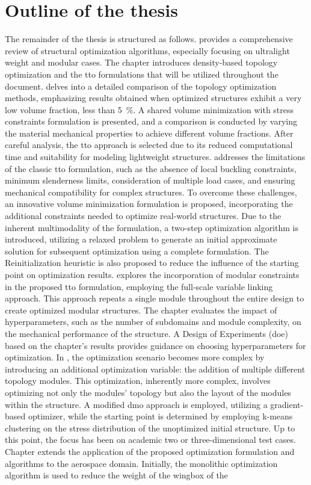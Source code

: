 \section*{Outline of the thesis}
The remainder of the thesis is structured as follows.  provides a comprehensive review of structural optimization algorithms, especially focusing on ultralight weight and modular cases. The chapter introduces density-based topology optimization and the \gls{tto} formulations that will be utilized throughout the document.  delves into a detailed comparison of the topology optimization methods, emphasizing results obtained when optimized structures exhibit a very low volume fraction, \ie less than \qty{5}{\percent}. A shared volume minimization with stress constraints formulation is presented, and a comparison is conducted by varying the material mechanical properties to achieve different volume fractions. After careful analysis, the \gls{tto} approach is selected due to its reduced computational time and suitability for modeling lightweight structures.  addresses the limitations of the classic \gls{tto} formulation, such as the absence of local buckling constraints, minimum slenderness limits, consideration of multiple load cases, and ensuring mechanical compatibility for complex structures. To overcome these challenges, an innovative volume minimization formulation is proposed, incorporating the additional constraints needed to optimize real-world structures. Due to the inherent multimodality of the formulation, a two-step optimization algorithm is introduced, utilizing a relaxed problem to generate an initial approximate solution for subsequent optimization using a complete formulation. The Reinitialization heuristic is also proposed to reduce the influence of the starting point on optimization results.  explores the incorporation of modular constraints in the proposed \gls{tto} formulation, employing the full-scale variable linking approach. This approach repeats a single module throughout the entire design to create optimized modular structures. The chapter evaluates the impact of hyperparameters, such as the number of subdomains and module complexity, on the mechanical performance of the structure. A Design of Experiments (\gls{doe}) based on the chapter's results provides guidance on choosing hyperparameters for optimization. In , the optimization scenario becomes more complex by introducing an additional optimization variable: the addition of multiple different topology modules. This optimization, inherently more complex, involves optimizing not only the modules' topology but also the layout of the modules within the structure. A modified \gls{dmo} approach is employed, utilizing a gradient-based optimizer, while the starting point is determined by employing k-means clustering on the stress distribution of the unoptimized initial structure. Up to this point, the focus has been on academic two or three-dimensional test cases. Chapter  extends the application of the proposed optimization formulation and algorithms to the aerospace domain. Initially, the monolithic optimization algorithm is used to reduce the weight of the wingbox of the 